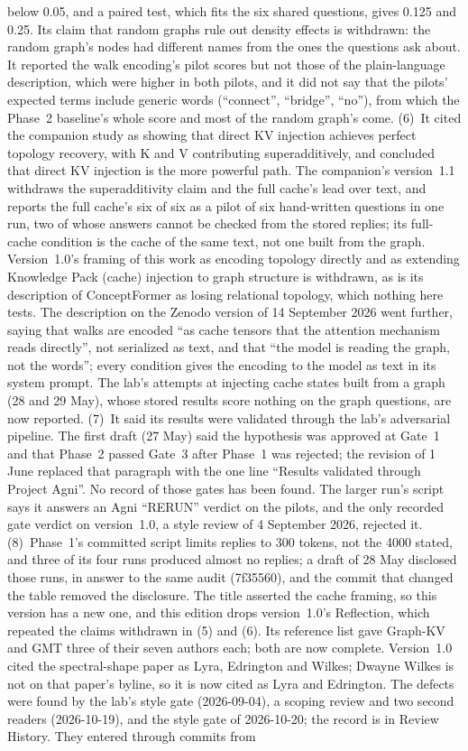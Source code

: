 \documentclass[11pt,a4paper]{article}
\begin{document}
below 0.05, and a paired test, which fits the six shared questions, gives 0.125 and 0.25. Its claim that random graphs rule out density effects is withdrawn: the random graph's nodes had different names from the ones the questions ask about. It reported the walk encoding's pilot scores but not those of the plain-language description, which were higher in both pilots, and it did not say that the pilots' expected terms include generic words (``connect'', ``bridge'', ``no''), from which the Phase~2 baseline's whole score and most of the random graph's come. (6)~It cited the companion study \citep{nexus2026kv} as showing that direct KV injection achieves perfect topology recovery, with K and V contributing superadditively, and concluded that direct KV injection is the more powerful path. The companion's version~1.1 withdraws the superadditivity claim and the full cache's lead over text, and reports the full cache's six of six as a pilot of six hand-written questions in one run, two of whose answers cannot be checked from the stored replies; its full-cache condition is the cache of the same text, not one built from the graph. Version~1.0's framing of this work as encoding topology directly and as extending Knowledge Pack (cache) injection to graph structure is withdrawn, as is its description of ConceptFormer as losing relational topology, which nothing here tests. The description on the Zenodo version of 14 September 2026 went further, saying that walks are encoded ``as cache tensors that the attention mechanism reads directly'', not serialized as text, and that ``the model is reading the graph, not the words''; every condition gives the encoding to the model as text in its system prompt. The lab's attempts at injecting cache states built from a graph (28 and 29 May), whose stored results score nothing on the graph questions, are now reported. (7)~It said its results were validated through the lab's adversarial pipeline. The first draft (27 May) said the hypothesis was approved at Gate~1 and that Phase~2 passed Gate~3 after Phase~1 was rejected; the revision of 1 June replaced that paragraph with the one line ``Results validated through Project Agni''. No record of those gates has been found. The larger run's script says it answers an Agni ``RERUN'' verdict on the pilots, and the only recorded gate verdict on version~1.0, a style review of 4 September 2026, rejected it. (8)~Phase~1's committed script limits replies to 300 tokens, not the 4000 stated, and three of its four runs produced almost no replies; a draft of 28 May disclosed those runs, in answer to the same audit (7f35560), and the commit that changed the table removed the disclosure. The title asserted the cache framing, so this version has a new one, and this edition drops version~1.0's Reflection, which repeated the claims withdrawn in (5) and (6). Its reference list gave Graph-KV and GMT three of their seven authors each; both are now complete. Version~1.0 cited the spectral-shape paper as Lyra, Edrington and Wilkes; Dwayne Wilkes is not on that paper's byline, so it is now cited as Lyra and Edrington. The defects were found by the lab's style gate (2026-09-04), a scoping review and two second readers (2026-10-19), and the style gate of 2026-10-20; the record is in Review History. They entered through commits from 
\end{document}
